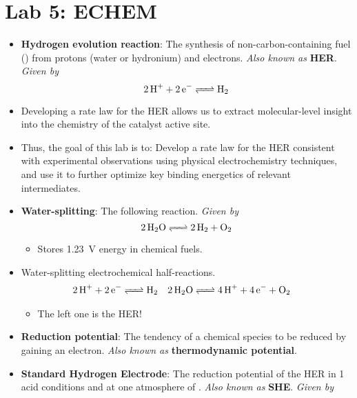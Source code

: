 \documentclass[../notes.tex]{subfiles}
\begin{document}
\section{Lab 5: ECHEM}
\begin{itemize}
    \item {}\textbf{Hydrogen evolution reaction}: The synthesis of non-carbon-containing fuel () from protons (water or hydronium) and electrons. \emph{Also known as} \textbf{HER}. \emph{Given by}
    \begin{equation*}
        \ce{2H+ + 2e^- <=> H2}
    \end{equation*}
    \item Developing a rate law for the HER allows us to extract molecular-level insight into the chemistry of the catalyst active site.
    \item Thus, the goal of this lab is to: Develop a rate law for the HER consistent with experimental observations using physical electrochemistry techniques, and use it to further optimize key binding energetics of relevant intermediates.
    \item \textbf{Water-splitting}: The following reaction. \emph{Given by}
    \begin{equation*}
        \ce{2H2O <=> 2H2 + O2}
    \end{equation*}
    \begin{itemize}
        \item Stores \SI{1.23}{\volt} energy in chemical fuels.
    \end{itemize}
    \item Water-splitting electrochemical half-reactions.
    \begin{align*}
        \ce{2H+ + 2e^-} &\ce{<=>} \ce{H2}&
        \ce{2H2O} &\ce{<=>} \ce{4H+ + 4e^- + O2}
    \end{align*}
    \begin{itemize}
        \item The left one is the HER!
    \end{itemize}
    \item \textbf{Reduction potential}: The tendency of a chemical species to be reduced by gaining an electron. \emph{Also known as} \textbf{thermodynamic potential}.
    \item \textbf{Standard Hydrogen Electrode}: The reduction potential of the HER in \SI{1}{\molar} acid conditions and at one atmosphere of . \emph{Also known as} \textbf{SHE}. \emph{Given by}
    \begin{equation*}

\end{equation*}
\end{itemize}
\end{document}
